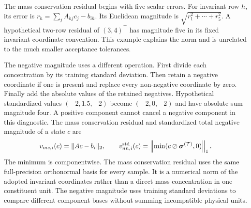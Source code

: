 The mass conservation residual begins with five scalar errors. For invariant row $h$, its error is $r_h=\sum_jA_{hj}c_j-b_{ih}$. Its Euclidean magnitude is $\sqrt{r_1^2+\cdots+r_5^2}$. A hypothetical two-row residual of $(3,4)^\top$ has magnitude five in its fixed invariant-coordinate convention. This example explains the norm and is unrelated to the much smaller acceptance tolerances.

The negative magnitude uses a different operation. First divide each concentration by its training standard deviation. Then retain a negative coordinate if one is present and replace every non-negative coordinate by zero. Finally add the absolute values of the retained negatives. Hypothetical standardized values $(-2,1.5,-2)$ become $(-2,0,-2)$ and have absolute-sum magnitude four. A positive component cannot cancel a negative component in this diagnostic. The mass conservation residual and standardized total negative magnitude of a state $c$ are
\begin{equation}
\equationname{Mass conservation residual and standardized negative concentration}
v_{mc,i}(c)=\|Ac-b_i\|_2,\qquad
v_{nn,i}^{\mathrm{std}}(c)=
\left\|\min(c\oslash\boldsymbol{\sigma}^{(\mathcal{T})},0)\right\|_1.
\label{eq:projection_violation_magnitudes}
\end{equation}
The minimum is componentwise. The mass conservation residual uses the same full-precision orthonormal basis for every sample. It is a numerical norm of the adopted invariant coordinates rather than a direct mass concentration in one constituent unit. The negative magnitude uses training standard deviations to compare different component bases without summing incompatible physical units.

